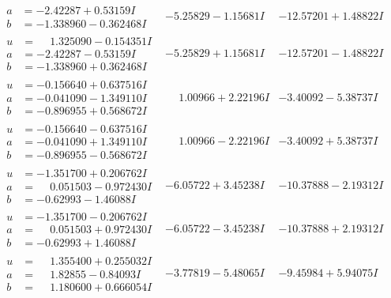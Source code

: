 \documentclass[1p]{elsarticle_modified}
\theoremstyle{definition}
\begin{document}
$$\begin{array}{c|c|c}
\begin{aligned}
a &= -2.42287 + 0.53159 I \\
b &= -1.338960 - 0.362468 I\end{aligned}
 & -5.25829 - 1.15681 I & -12.57201 + 1.48822 I \\ \hline\begin{aligned}
u &= \phantom{-}1.325090 - 0.154351 I \\
a &= -2.42287 - 0.53159 I \\
b &= -1.338960 + 0.362468 I\end{aligned}
 & -5.25829 + 1.15681 I & -12.57201 - 1.48822 I \\ \hline\begin{aligned}
u &= -0.156640 + 0.637516 I \\
a &= -0.041090 - 1.349110 I \\
b &= -0.896955 + 0.568672 I\end{aligned}
 & \phantom{-}1.00966 + 2.22196 I & -3.40092 - 5.38737 I \\ \hline\begin{aligned}
u &= -0.156640 - 0.637516 I \\
a &= -0.041090 + 1.349110 I \\
b &= -0.896955 - 0.568672 I\end{aligned}
 & \phantom{-}1.00966 - 2.22196 I & -3.40092 + 5.38737 I \\ \hline\begin{aligned}
u &= -1.351700 + 0.206762 I \\
a &= \phantom{-}0.051503 - 0.972430 I \\
b &= -0.62993 - 1.46088 I\end{aligned}
 & -6.05722 + 3.45238 I & -10.37888 - 2.19312 I \\ \hline\begin{aligned}
u &= -1.351700 - 0.206762 I \\
a &= \phantom{-}0.051503 + 0.972430 I \\
b &= -0.62993 + 1.46088 I\end{aligned}
 & -6.05722 - 3.45238 I & -10.37888 + 2.19312 I \\ \hline\begin{aligned}
u &= \phantom{-}1.355400 + 0.255032 I \\
a &= \phantom{-}1.82855 - 0.84093 I \\
b &= \phantom{-}1.180600 + 0.666054 I\end{aligned}
 & -3.77819 - 5.48065 I & -9.45984 + 5.94075 I \\ \hline\begin{aligned}

\end{aligned}
\end{array}$$
\end{document}

